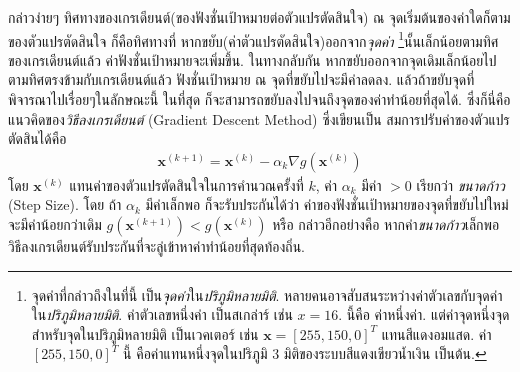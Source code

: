กล่าวง่ายๆ ทิศทางของเกรเดียนต์(ของฟังชั่นเป้าหมายต่อตัวแปรตัดสินใจ) ณ จุดเริ่มต้นของค่าใดก็ตามของตัวแปรตัดสินใจ  
ก็คือทิศทางที่ หากขยับ(ค่าตัวแปรตัดสินใจ)ออกจาก\textit{จุดค่า}%
\footnote{
จุดค่าที่กล่าวถึงในที่นี้ เป็น\textit{จุดค่า}ใน\textit{ปริภูมิหลายมิติ}.
หลายคนอาจสับสนระหว่างค่าตัวเลขกับจุดค่าใน\textit{ปริภูมิหลายมิติ}.
ค่าตัวเลขหนึ่งค่า เป็นสเกล่าร์ เช่น $x = 16$.
นี้คือ ค่าหนึ่งค่า.
แต่ค่าจุดหนึ่งจุด สำหรับจุดในปริภูมิหลายมิติ เป็นเวคเตอร์ 
เช่น $\mathbf{x} = [255, 150, 0]^T$ แทนสีแดงอมแสด.
ค่า $[255, 150, 0]^T$ นี้ คือค่าแทนหนึ่งจุดในปริภูมิ $3$ มิติของระบบสีแดงเขียวน้ำเงิน เป็นต้น.
}นั้นเล็กน้อยตามทิศของเกรเดียนต์แล้ว
ค่าฟังชั่นเป้าหมายจะเพิ่มขึ้น.
ในทางกลับกัน หากขยับออกจากจุดเดิมเล็กน้อยไปตามทิศตรงข้ามกับเกรเดียนต์แล้ว 
ฟังชั่นเป้าหมาย ณ จุดที่ขยับไปจะมีค่าลดลง.
แล้วถ้าขยับจุดที่พิจารณาไปเรื่อยๆในลักษณะนี้ ในที่สุด ก็จะสามารถขยับลงไปจนถึงจุดของค่าทำน้อยที่สุดได้.
ซึ่งก็นี่คือ แนวคิดของ\textit{วิธีลงเกรเดียนต์} (Gradient Descent Method) ซึ่งเขียนเป็น
สมการปรับค่าของตัวแปรตัดสินได้คือ
\begin{eqnarray}
   \mathbf{x}^{(k+1)} = \mathbf{x}^{(k)} 
   - \alpha_k \nabla g(\mathbf{x}^{(k)})
\label{eq: gradient descent update}   
\end{eqnarray}
โดย $\mathbf{x}^{(k)}$ แทนค่าของตัวแปรตัดสินใจในการคำนวณครั้งที่ $k$,
ค่า $\alpha_k$ มีค่า $>0$ เรียกว่า \textit{ขนาดก้าว} (Step Size).
โดย ถ้า $\alpha_k$ มีค่าเล็กพอ ก็จะรับประกันได้ว่า ค่าของฟังชั่นเป้าหมายของจุดที่ขยับไปใหม่จะมีค่าน้อยกว่าเดิม $g(\mathbf{x}^{(k+1)}) < g(\mathbf{x}^{(k)})$ หรือ กล่าวอีกอย่างคือ หากค่า\textit{ขนาดก้าว}เล็กพอ วิธีลงเกรเดียนต์รับประกันที่จะลู่เข้าหาค่าทำน้อยที่สุดท้องถิ่น.

